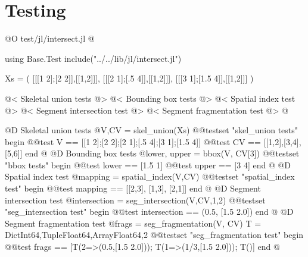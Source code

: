 \documentclass[10pt,oneside]{article}
\begin{document}
\section{Testing}
@O test/jl/intersect.jl
@{using Base.Test
include("../../lib/jl/intersect.jl")

Xs = (
    [[[1 2];[2 2]],[[1,2]]],
    [[[2 1];[.5 4]],[[1,2]]],
    [[[3 1];[1.5 4]],[[1,2]]]
)

@< Skeletal union tests @>
@< Bounding box tests @>
@< Spatial index test @>
@< Segment intersection test @>
@< Segment fragmentation test @>
@}
@D Skeletal union tests
@{V,CV = skel_union(Xs)
@@testset "skel_union tests" begin
    @@test V == [[1 2];[2 2];[2 1];[.5 4];[3 1];[1.5 4]]
    @@test CV == [[1,2],[3,4],[5,6]]
end
@}
@D Bounding box tests
@{lower, upper = bbox(V, CV[3])
@@testset "bbox tests" begin
    @@test lower == [1.5 1]
    @@test upper == [3 4]
end
@}
@D Spatial index test
@{mapping = spatial_index(V,CV)
@@testset "spatial_index test" begin
    @@test mapping == [[2,3], [1,3], [2,1]]
end
@}
@D Segment intersection test
@{intersection = seg_intersection(V,CV,1,2)
@@testset "seg_intersection test" begin
    @@test intersection == (0.5, [1.5 2.0])
end
@}
@D Segment fragmentation test
@{frags = seg_fragmentation(V, CV)
T = Dict{Int64,Tuple{Float64,Array{Float64,2}}}
@@testset "seg_fragmentation test" begin
    @@test frags == [T(2=>(0.5,[1.5 2.0])); T(1=>(1/3,[1.5 2.0])); T()]
end
@}
\end{document}
